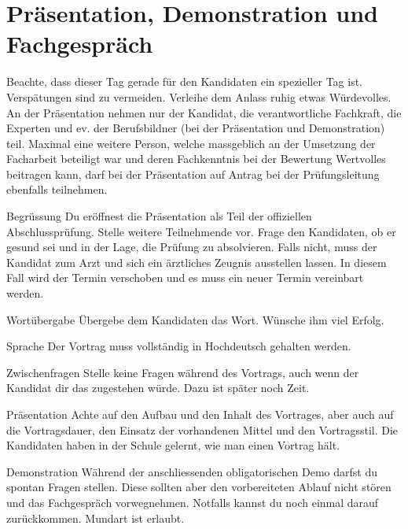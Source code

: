 \section{Präsentation, Demonstration und Fachgespräch}
Beachte, dass dieser Tag gerade für den Kandidaten ein spezieller Tag ist. Verspätungen sind zu vermeiden. Verleihe dem Anlass ruhig etwas Würdevolles. An der Präsentation nehmen nur der Kandidat, die verantwortliche Fachkraft, die Experten und ev. der Berufsbildner (bei der Präsentation und Demonstration) teil. Maximal eine weitere Person, welche massgeblich an der Umsetzung der Facharbeit beteiligt war und deren Fachkenntnis bei der Bewertung Wertvolles beitragen kann, darf bei der Präsentation auf Antrag bei der Prüfungsleitung ebenfalls teilnehmen.

\begin{taskitem}{Begrüssung}
  Du eröffnest die Präsentation als Teil der offiziellen Abschlussprüfung. Stelle weitere Teilnehmende vor. Frage den Kandidaten, ob er gesund sei und in der Lage, die Prüfung zu absolvieren. Falls nicht, muss der Kandidat zum Arzt und sich ein ärztliches Zeugnis ausstellen lassen. In diesem Fall wird der Termin verschoben und es muss ein neuer Termin vereinbart werden.
\end{taskitem}
\begin{taskitemwithoutcomment}{Wortübergabe}
  Übergebe dem Kandidaten das Wort. Wünsche ihm viel Erfolg.
\end{taskitemwithoutcomment}
\begin{taskitem}{Sprache}
  Der Vortrag muss vollständig in Hochdeutsch gehalten werden.
\end{taskitem}
\begin{taskitemwithoutcomment}{Zwischenfragen}
  Stelle keine Fragen während des Vortrags, auch wenn der Kandidat dir das zugestehen würde. Dazu ist später noch Zeit.
\end{taskitemwithoutcomment}
\begin{taskitem}{Präsentation}
  Achte auf den Aufbau und den Inhalt des Vortrages, aber auch auf die Vortragsdauer, den Einsatz der vorhandenen Mittel und den Vortragsstil. Die Kandidaten haben in der Schule gelernt, wie man einen Vortrag hält.
\end{taskitem}
\begin{taskitem}{Demonstration}
  Während der anschliessenden obligatorischen Demo darfst du spontan Fragen stellen. Diese sollten aber den vorbereiteten Ablauf nicht stören und das Fachgespräch vorwegnehmen. Notfalls kannst du noch einmal darauf zurückkommen. Mundart ist erlaubt.
\end{taskitem}
